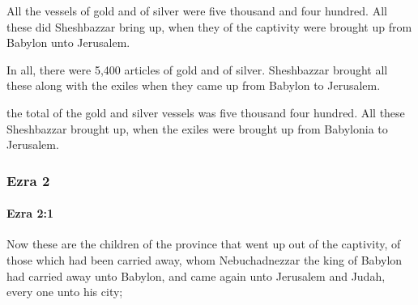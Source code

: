 			\begin{versebox}
					\item[BHS] 
					\item[LXX] 
					\item[ASV] All the vessels of gold and of silver were five thousand and four hundred. All these did Sheshbazzar bring up, when they of the captivity were brought up from Babylon unto Jerusalem.
					\item[NIV] In all, there were 5,400 articles of gold and of silver. Sheshbazzar brought all these along with the exiles when they came up from Babylon to Jerusalem.
					\item[NRSV] the total of the gold and silver vessels was five thousand four hundred. All these Sheshbazzar brought up, when the exiles were brought up from Babylonia to Jerusalem.
			\end{versebox}
	\subsubsection{Ezra 2} %
		\label{EZRA-2}

		\paragraph{Ezra 2:1} %
			\label{EZRA-2-1}

			Now these are the children of the province that went up out of the captivity, of those which had been carried away, whom Nebuchadnezzar the king of Babylon had carried away unto Babylon, and came again unto Jerusalem and Judah, every one unto his city;

